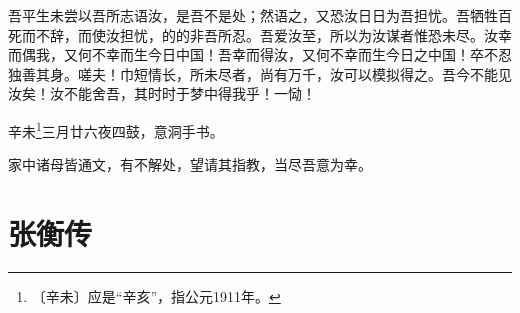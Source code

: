 \documentclass[12pt,UTF-8,openany]{ctexbook}
\begin{document}
\begin{normalsize}
    吾平生未尝以吾所志语汝，是吾不是处；然语之，又恐汝日日为吾担忧。吾牺牲百死而不辞，而使汝担忧，的的非吾所忍。吾爱汝至，所以为汝谋者惟恐未尽。汝幸而偶我，又何不幸而生今日中国！吾幸而得汝，又何不幸而生今日之中国！卒不忍独善其身。嗟夫！巾短情长，所未尽者，尚有万千，汝可以模拟得之。吾今不能见汝矣！汝不能舍吾，其时时于梦中得我乎！一恸！
    
    辛未\footnote{〔辛未〕应是“辛亥”，指公元1911年。}三月廿六夜四鼓，意洞手书。
    
    家中诸母皆通文，有不解处，望请其指教，当尽吾意为幸。
\end{normalsize}



\chapter{张衡传}
\end{document}
